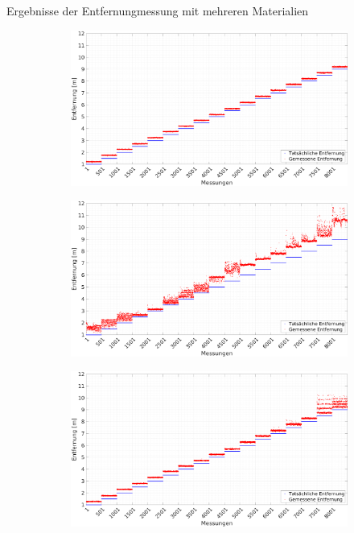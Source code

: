 \documentclass{beamer}
\begin{document}
%
%
\begin{frame}{Ergebnisse der Entfernungmessung mit mehreren Materialien}
	\begin{figure}
		\centering
		\begin{subfigure}[t]{0.47\linewidth}
			\centering
			\includegraphics[width=\linewidth]{entfernungsmessung_2018_01_20_los}
		\end{subfigure}
		\hfill
		\begin{subfigure}[t]{0.47\linewidth}
			\centering
			\includegraphics[width=\linewidth]{entfernungsmessung_2018_01_20_nlos_water}
		\end{subfigure}
		\par
		\bigskip
		\begin{subfigure}[t]{0.47\linewidth}
			\centering
			\includegraphics[width=\linewidth]{entfernungsmessung_2018_01_20_nlos_metal}

\end{subfigure}
\end{figure}
\end{frame}
\end{document}
